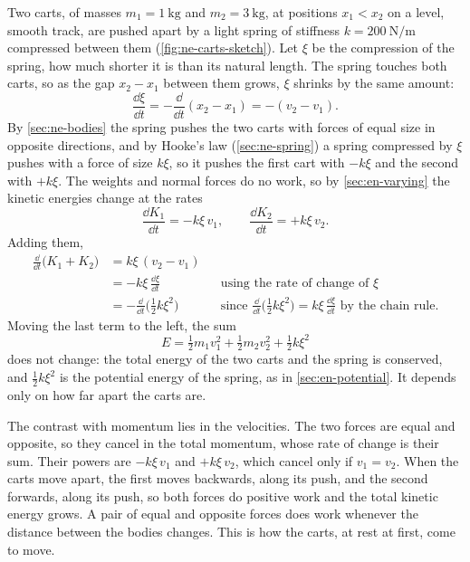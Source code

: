 Two carts, of masses $m_1 = \SI{1}{\kilogram}$ and $m_2 =
\SI{3}{\kilogram}$, at positions $x_1 < x_2$ on a level, smooth track,
are pushed apart by a light spring of stiffness $k =
\SI{200}{\newton\per\metre}$ compressed between them
(\cref{fig:ne-carts-sketch}). Let $\xi$ be the compression of the spring,
how much shorter it is than its natural length. The spring touches both
carts, so as the gap $x_2 - x_1$ between them grows, $\xi$ shrinks by the
same amount:
\begin{equation*}
   \frac{\dd \xi}{\dd t} = -\frac{\dd}{\dd t}(x_2 - x_1) = -(v_2 - v_1) .
\end{equation*}
By \cref{sec:ne-bodies} the spring pushes the two carts with forces of
equal size in opposite directions, and by Hooke's law
(\cref{sec:ne-spring}) a spring compressed by $\xi$ pushes with a force of
size $k\xi$, so it pushes the first cart with $-k\xi$ and the second with
$+k\xi$. The weights and normal forces do no work, so by \cref{sec:en-varying} the kinetic energies change at the rates
\begin{equation*}
   \frac{\dd K_1}{\dd t} = -k\xi\,v_1 , \qquad
   \frac{\dd K_2}{\dd t} = +k\xi\,v_2 .
\end{equation*}
Adding them,
\begin{align*}
   \frac{\dd}{\dd t}\bigl(K_1 + K_2\bigr) &= k\xi\,(v_2 - v_1)\\
   &= -k\xi\,\frac{\dd \xi}{\dd t}
      && \text{using the rate of change of $\xi$}\\
   &= -\frac{\dd}{\dd t}\bigl(\tfrac12 k\xi^2\bigr)
      && \text{since $\tfrac{\dd}{\dd t}\bigl(\tfrac12 k\xi^2\bigr)
         = k\xi\,\tfrac{\dd \xi}{\dd t}$ by the chain rule.}
\end{align*}
Moving the last term to the left, the sum
\begin{equation*}
   E = \tfrac12 m_1 v_1^2 + \tfrac12 m_2 v_2^2 + \tfrac12 k \xi^2
\end{equation*}
does not change: the total energy of the two carts and the spring is
conserved, and $\frac12 k\xi^2$ is the potential energy of the spring, as in
\cref{sec:en-potential}. It depends only on how far apart the carts are.

The contrast with momentum lies in the velocities. The two forces are
equal and opposite, so they cancel in the total momentum, whose rate of
change is their sum. Their powers are $-k\xi\,v_1$ and $+k\xi\,v_2$, which
cancel only if $v_1 = v_2$. When the carts move apart, the first moves
backwards, along its push, and the second forwards, along its push, so
both forces do positive work and the total kinetic energy grows. A pair
of equal and opposite forces does work whenever the distance between the
bodies changes. This is how the carts, at rest at first, come to move.

